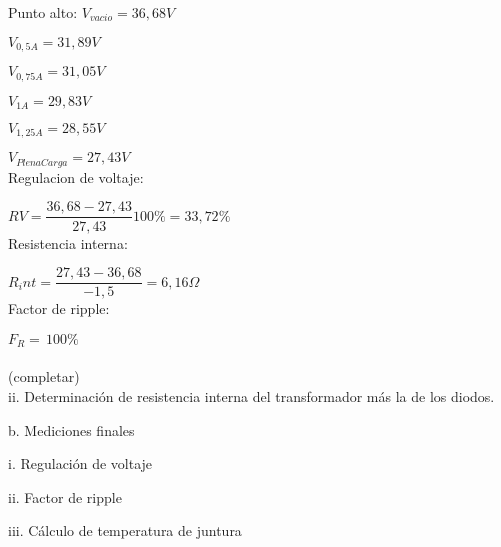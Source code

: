 \begin{figure}[H]
\end{figure}


Punto alto: 
  $V_{vacio} = 36,68 V$

  $V_{0,5A} = 31,89 V$
  
  $V_{0,75A} = 31,05 V$ 
  
  $V_{1A} = 29,83 V$
  
  $V_{1,25A} = 28,55 V$
  
  $V_{PlenaCarga} = 27,43 V$\\

Regulacion de voltaje:

$RV = \dfrac{36,68 - 27,43}{27,43} 100\percent = 33,72\percent $\\

Resistencia interna:

$R_int = \dfrac{27,43 - 36,68}{-1,5} = 6,16\Omega $\\

Factor de ripple:

$F_R = \dfrac{}{} 100\percent $

(completar)\\

ii. Determinación de resistencia interna del transformador más la de los
diodos.

b. Mediciones finales

i. Regulación de voltaje

ii. Factor de ripple

iii. Cálculo de temperatura de juntura
